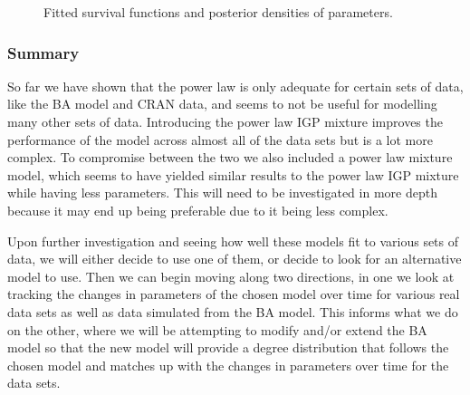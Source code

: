 \documentclass[
]{article}
\begin{document}
\begin{figure}[H]


\caption{\label{fig-plpl}Fitted survival functions and posterior
densities of parameters.}

\end{figure}%

\subsubsection{Summary}\label{summary}

So far we have shown that the power law is only adequate for certain
sets of data, like the BA model and CRAN data, and seems to not be
useful for modelling many other sets of data. Introducing the power law
IGP mixture improves the performance of the model across almost all of
the data sets but is a lot more complex. To compromise between the two
we also included a power law mixture model, which seems to have yielded
similar results to the power law IGP mixture while having less
parameters. This will need to be investigated in more depth because it
may end up being preferable due to it being less complex.

Upon further investigation and seeing how well these models fit to
various sets of data, we will either decide to use one of them, or
decide to look for an alternative model to use. Then we can begin moving
along two directions, in one we look at tracking the changes in
parameters of the chosen model over time for various real data sets as
well as data simulated from the BA model. This informs what we do on the
other, where we will be attempting to modify and/or extend the BA model
so that the new model will provide a degree distribution that follows
the chosen model and matches up with the changes in parameters over time
for the data sets.
\end{document}
